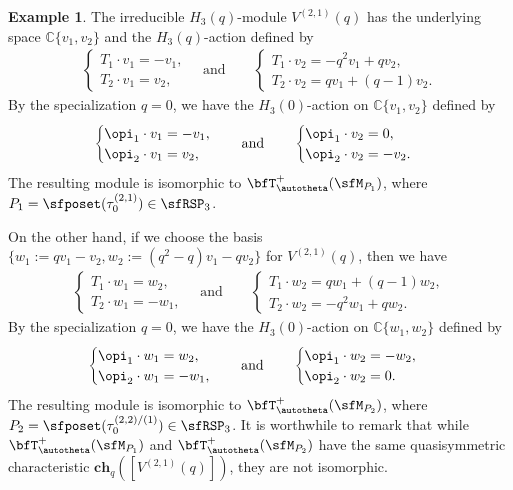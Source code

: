 \documentclass[12pt, reqno]{amsart}
\theoremstyle{definition}
\newtheorem{example}[theorem]{Example}
\numberwithin{equation}{section} \numberwithin{figure}{section}
\numberwithin{table}{section}
\def\C{\mathbb C}
\begin{document}
\begin{example}
The irreducible $H_3(q)$-module $V^{(2,1)}(q)$ has the underlying space $\C\{v_1, v_2\}$ and the $H_3(q)$-action defined by
\begin{align*}
\begin{cases}
T_1 \cdot v_1 = -v_1, \\
T_2 \cdot v_1 = v_2,
\end{cases}
\quad \text{and} \quad\quad
\begin{cases}
T_1 \cdot v_2 = -q^2 v_1  + q v_2, \\
T_2 \cdot v_2 = qv_1 + (q - 1)v_2.
\end{cases}
\end{align*}
By the specialization $q = 0$, we have the $H_3(0)$-action on $\C\{v_1, v_2\}$ defined by
\begin{align*}
\begin{cases}
\opi_1 \cdot v_1 = -v_1, \\
\opi_2 \cdot v_1 = v_2,
\end{cases}
\quad \text{and} \quad\quad
\begin{cases}
\opi_1 \cdot v_2 = 0, \\
\opi_2 \cdot v_2 = - v_2.
\end{cases}
\end{align*}
The resulting module is isomorphic to $\bfT^{+}_\autotheta(\sfM_{P_1})$, where $P_1 = \sfposet(\tau_0^{(2,1)}) \in \sfRSP_3$.


On the other hand, if we choose the basis
 $\{w_1 := qv_1 - v_2, w_2 := (q^2 - q) v_1 - q v_2\}$ for $V^{(2,1)}(q)$,
 then we have
\begin{align*}
\begin{cases}
T_1 \cdot w_1 = w_2, \\
T_2 \cdot w_1 = -w_1,
\end{cases}
\quad \text{and} \quad\quad
\begin{cases}
T_1 \cdot w_2 = qw_1 + (q-1)w_2, \\
T_2 \cdot w_2 = -q^2 w_1 + q w_2.
\end{cases}
\end{align*}
By the specialization $q = 0$, we have the $H_3(0)$-action on $\C\{w_1, w_2\}$ defined by
\begin{align*}
\begin{cases}
\opi_1 \cdot w_1 = w_2, \\
\opi_2 \cdot w_1 = -w_1,
\end{cases}
\quad \text{and} \quad\quad
\begin{cases}
\opi_1 \cdot w_2 = -w_2, \\
\opi_2 \cdot w_2 = 0.
\end{cases}
\end{align*}
The resulting module is isomorphic to $\bfT^{+}_\autotheta(\sfM_{P_2})$, where $P_2 = \sfposet(\tau_0^{(2,2)/(1)}) \in \sfRSP_3$.
It is worthwhile to remark   that while $\bfT^{+}_\autotheta(\sfM_{P_1})$ and $\bfT^{+}_\autotheta(\sfM_{P_2})$ have the same quasisymmetric characteristic  
$\textbf{ch}_q([V^{(2,1)}(q)])$,  they are not isomorphic.
\end{example}
\end{document}
